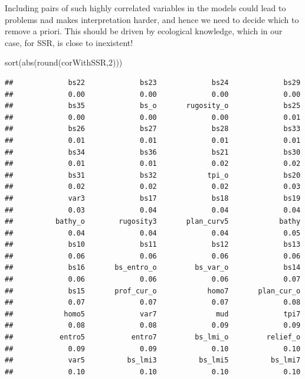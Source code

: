 \documentclass[
]{book}
\newenvironment{Shaded}{\begin{snugshade}}{\end{snugshade}}
\newcommand{\DecValTok}[1]{\textcolor[rgb]{0.00,0.00,0.81}{#1}}
\newcommand{\FunctionTok}[1]{\textcolor[rgb]{0.00,0.00,0.00}{#1}}
\newcommand{\NormalTok}[1]{#1}
\begin{document}
Including pairs of such highly correlated variables in the models could lead to problems nad makes interpretation harder, and hence we need to decide which to remove a priori. This should be driven by ecological knowledge, which in our case, for SSR, is close to inexistent!

\begin{Shaded}
\begin{Highlighting}[]
\FunctionTok{sort}\NormalTok{(}\FunctionTok{abs}\NormalTok{(}\FunctionTok{round}\NormalTok{(corWithSSR,}\DecValTok{2}\NormalTok{)))}
\end{Highlighting}
\end{Shaded}

\begin{verbatim}
##             bs22             bs23             bs24             bs29 
##             0.00             0.00             0.00             0.00 
##             bs35             bs_o       rugosity_o             bs25 
##             0.00             0.00             0.00             0.01 
##             bs26             bs27             bs28             bs33 
##             0.01             0.01             0.01             0.01 
##             bs34             bs36             bs21             bs30 
##             0.01             0.01             0.02             0.02 
##             bs31             bs32            tpi_o             bs20 
##             0.02             0.02             0.02             0.03 
##             var3             bs17             bs18             bs19 
##             0.03             0.04             0.04             0.04 
##          bathy_o        rugosity3       plan_curv5            bathy 
##             0.04             0.04             0.04             0.05 
##             bs10             bs11             bs12             bs13 
##             0.06             0.06             0.06             0.06 
##             bs16       bs_entro_o         bs_var_o             bs14 
##             0.06             0.06             0.06             0.07 
##             bs15       prof_cur_o            homo7       plan_cur_o 
##             0.07             0.07             0.07             0.08 
##            homo5             var7              mud             tpi7 
##             0.08             0.08             0.09             0.09 
##           entro5           entro7         bs_lmi_o         relief_o 
##             0.09             0.09             0.10             0.10 
##             var5          bs_lmi3          bs_lmi5          bs_lmi7 
##             0.10             0.10             0.10             0.10 

\end{verbatim}
\end{document}
